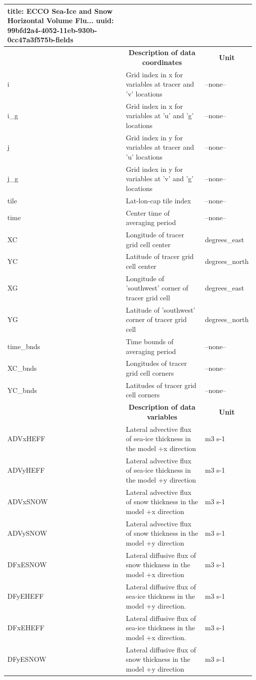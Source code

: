 \begin{longtable}{|m{}|m{}|m{}|}
{    title:                        ECCO Sea-Ice and Snow Horizontal Volume Flu...
    uuid:                         99bfd2a4-4052-11eb-930b-0cc47a3f575b-fields} \\ 
\hline \endhead \hline \endfoot
\rowcolor{lightgray} \multicolumn{1}{|c|}{\textbf{Coordinates}} & \multicolumn{1}{|c|}{\textbf{Description of data coordinates}} &  \multicolumn{1}{|c|}{\textbf{Unit}}\\ \hline
i &Grid index in x for variables at tracer and 'v' locations &--none--  \\ \hline
i\_g &Grid index in x for variables at 'u' and 'g' locations &--none--  \\ \hline
j &Grid index in y for variables at tracer and 'u' locations &--none--  \\ \hline
j\_g &Grid index in y for variables at 'v' and 'g' locations &--none--  \\ \hline
tile &Lat-lon-cap tile index &--none--  \\ \hline
time &Center time of averaging period &--none--  \\ \hline
XC &Longitude of tracer grid cell center &degrees\_east  \\ \hline
YC &Latitude of tracer grid cell center &degrees\_north  \\ \hline
XG &Longitude of 'southwest' corner of tracer grid cell &degrees\_east  \\ \hline
YG &Latitude of 'southwest' corner of tracer grid cell &degrees\_north  \\ \hline
time\_bnds &Time bounds of averaging period &--none--  \\ \hline
XC\_bnds &Longitudes of tracer grid cell corners &--none--  \\ \hline
YC\_bnds &Latitudes of tracer grid cell corners &--none--  \\ \hline
\rowcolor{lightgray} \multicolumn{1}{|c|}{\textbf{Variables}} & \multicolumn{1}{|c|}{\textbf{Description of data variables}} &  \multicolumn{1}{|c|}{\textbf{Unit}}\\ \hline
ADVxHEFF &Lateral advective flux of sea-ice thickness in the model +x direction &m3 s-1  \\ \hline
ADVyHEFF &Lateral advective flux of sea-ice thickness in the model +y direction &m3 s-1  \\ \hline
ADVxSNOW &Lateral advective flux of snow thickness in the model +x direction &m3 s-1  \\ \hline
ADVySNOW &Lateral advective flux of snow thickness in the model +y direction &m3 s-1  \\ \hline
DFxESNOW &Lateral diffusive flux of snow thickness in the model +x direction &m3 s-1  \\ \hline
DFyEHEFF &Lateral diffusive flux of sea-ice thickness in the model +y direction. &m3 s-1  \\ \hline
DFxEHEFF &Lateral diffusive flux of sea-ice thickness in the model +x direction. &m3 s-1  \\ \hline
DFyESNOW &Lateral diffusive flux of snow thickness in the model +y direction &m3 s-1  \\ \hline
\end{longtable}

